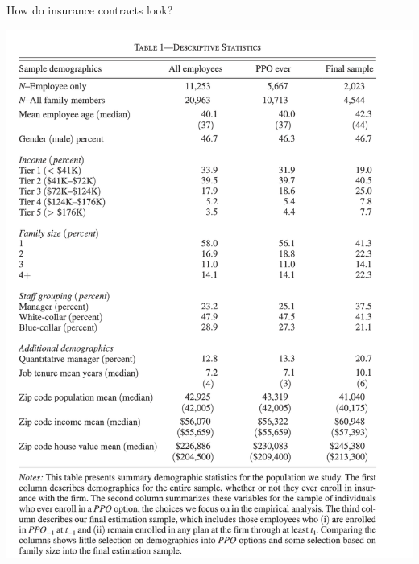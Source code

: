 \documentclass[xcolor=pdftex,dvipsnames,table,mathserif,aspectratio=169]{beamer}
\begin{document}
\begin{frame}{How do insurance contracts look?}
\begin{center}
\includegraphics[scale=.3]{resources/handel_t1.png}
\end{center}
\end{frame}
\end{document}
